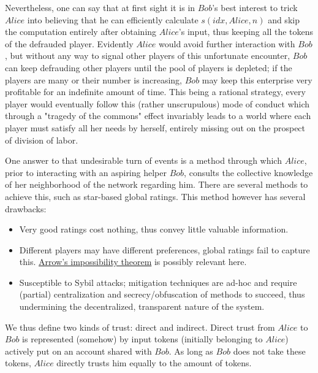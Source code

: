     Nevertheless, one can say that at first sight it is in $Bob$'s best interest to trick $Alice$ into believing that he can
    efficiently calculate $s\left(idx, Alice, n\right)$ and skip the computation entirely after obtaining $Alice$'s input,
    thus keeping all the tokens of the defrauded player. Evidently $Alice$ would avoid further interaction with $Bob$, but
    without any way to signal other players of this unfortunate encounter, $Bob$ can keep defrauding other players until the
    pool of players is depleted; if the players are many or their number is increasing, $Bob$ may keep this enterprise very
    profitable for an indefinite amount of time. This being a rational strategy, every player would eventually follow this
    (rather unscrupulous) mode of conduct which through a "tragedy of the commons" effect invariably leads to a world where
    each player must satisfy all her needs by herself, entirely missing out on the prospect of division of labor.

    One answer to that undesirable turn of events is a method through which $Alice$, prior to interacting with an aspiring
    helper $Bob$, consults the collective knowledge of her neighborhood of the network regarding him. There are several
    methods to achieve this, such as star-based global ratings. This method however has several drawbacks:

    \begin{itemize}
      \item Very good ratings cost nothing, thus convey little valuable information.
      \item Different players may have different preferences, global ratings fail to capture this.
      \href{https://en.wikipedia.org/wiki/Arrow\%27s_impossibility_theorem}{Arrow's impossibility theorem} is possibly relevant
      here.
      \item Susceptible to Sybil attacks; mitigation techniques are ad-hoc and require (partial) centralization and
      secrecy/obfuscation of methods to succeed, thus undermining the decentralized, transparent nature of the system.
    \end{itemize}

    We thus define two kinds of trust: direct and indirect. Direct trust from $Alice$ to $Bob$ is represented (somehow) by
    input tokens (initially belonging to $Alice$) actively put on an account shared with $Bob$. As long as $Bob$ does not take
    these tokens, $Alice$ directly trusts him equally to the amount of tokens.
    
